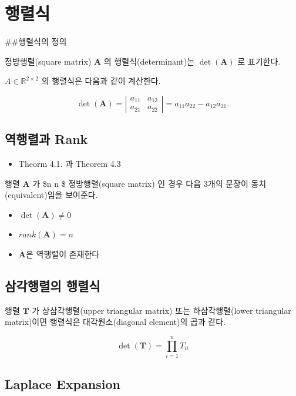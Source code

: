 \documentclass[
  11pt,
  a4paper,
  oneside]{scrbook}
\providecommand{\tightlist}{%
  \setlength{\itemsep}{0pt}\setlength{\parskip}{0pt}}\usepackage{longtable,booktabs,array}
\theoremstyle{definition}
\theoremstyle{definition}
\theoremstyle{plain}
\theoremstyle{remark}
\begin{document}
\section{행렬식}\label{uxd589uxb82cuxc2dd}

\#\#행렬식의 정의

정방행렬(square matrix) \(\pmb A\) 의 행렬식(determinant)는
\(\operatorname{det}(\pmb A)\) 로 표기한다.

\(A \in \mathbb{R}^{2 \times 2}\) 의 행렬식은 다음과 같이 계산한다.

\[
\operatorname{det}(\boldsymbol{A})=\left|\begin{array}{ll}
a_{11} & a_{12} \\
a_{21} & a_{22}
\end{array}\right|=a_{11} a_{22}-a_{12} a_{21} .
\]

\subsection{역행렬과 Rank}\label{uxc5eduxd589uxb82cuxacfc-rank}

\begin{itemize}
\tightlist
\item
  Theorm 4.1. 과 Theorem 4.3
\end{itemize}

행렬 \(\pmb A\) 가 \$n \times n \$ 정방행렬(square matrix) 인 경우 다음
3개의 문장이 동치(equivalent)임을 보여준다.

\begin{itemize}
\tightlist
\item
  \(\operatorname{det}(\boldsymbol{A}) \ne 0\)
\item
  \(rank(\boldsymbol{A}) = n\)
\item
  \(\boldsymbol{A}\)은 역행렬이 존재한다
\end{itemize}

\subsection{삼각행렬의
행렬식}\label{uxc0bcuxac01uxd589uxb82cuxc758-uxd589uxb82cuxc2dd}

행렬 \(\pmb T\) 가 상삼각행렬(upper triangular matrix) 또는
하삼각행렬(lower triangular matrix)이면 행렬식은 대각원소(diagonal
element)의 곱과 같다.

\[
\operatorname{det}(\boldsymbol{T}) = \prod_{i=1}^n T_{ii}
\]

\subsection{Laplace Expansion}\label{laplace-expansion}
\end{document}
